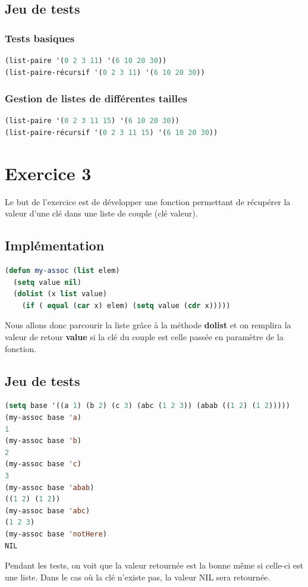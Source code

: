 \documentclass[a4paper,10pt]{report}
\begin{document}
	  \section{Jeu de tests}

	  \subsection{Tests basiques}
	  \begin{lstlisting}[language=Lisp]
(list-paire '(0 2 3 11) '(6 10 20 30))
(list-paire-récursif '(0 2 3 11) '(6 10 20 30))
	  \end{lstlisting}

	  \subsection{Gestion de listes de différentes tailles}
	  \begin{lstlisting}[language=Lisp]
(list-paire '(0 2 3 11 15) '(6 10 20 30))
(list-paire-récursif '(0 2 3 11 15) '(6 10 20 30))
	  \end{lstlisting}
	  
	  \chapter{Exercice 3}
	  
	  Le but de l'exercice est de développer une fonction permettant de récupérer la valeur d'une clé dans une liste de couple (clé valeur).
	  
	  \section{Implémentation}
	  \begin{lstlisting}[language=Lisp]
(defun my-assoc (list elem)
  (setq value nil)
  (dolist (x list value)
    (if ( equal (car x) elem) (setq value (cdr x)))))
	  \end{lstlisting}

	  Nous allons donc parcourir la liste grâce à la méthode \textbf{dolist} et on remplira la valeur de retour \textbf{value} si la clé du couple est celle passée en paramètre de la fonction.
	  
	  \section{Jeu de tests}
	  
	  \begin{lstlisting}[language=lisp]
(setq base '((a 1) (b 2) (c 3) (abc (1 2 3)) (abab ((1 2) (1 2)))))
(my-assoc base 'a)
1
(my-assoc base 'b)
2
(my-assoc base 'c)
3
(my-assoc base 'abab)
((1 2) (1 2))
(my-assoc base 'abc)
(1 2 3)
(my-assoc base 'notHere)
NIL
	  \end{lstlisting}
Pendant les tests, on voit que la valeur retournée est la bonne même si celle-ci est une liste. Dans le cas où la clé n'existe pas, la valeur NIL sera retournée.
	  
\end{document}
